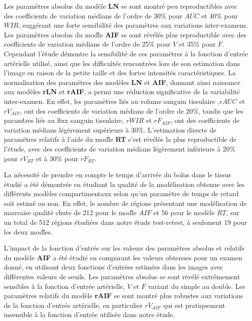 \begin{otherlanguage}{francais}
Les param\`etres absolus du mod\`ele \textbf{LN} se sont montr\'e peu reproductibles avec des coefficients de variation m\'edians de l'ordre de 30\% pour $AUC$ et 40\% pour $WIR$, sugg\'erant une forte sensibilit\'e des param\`etres aux variations inter-examens.
Les param\`etres absolus du mod\`le \textbf{AIF} se sont r\'ev\'el\'es plus reproductible avec des coefficients de variation m\'edians de l'ordre de 25\% pour $V$ et 35\% pour $F$.
Cependant l'\'etude d\'emontre la sensibilit\'e de ces param\`etres \`a la fonction d'entr\'ee art\'erielle utilis\'e, ainsi que les difficult\'es rencontr\'ees lors de son estimation dans l'image en raison de la petite taille et des fortes intensit\'es caract\'eristiques.
La normalisation des param\`etres des mod\`eles \textbf{LN} et \textbf{AIF}, donnant ainsi naissance aux mod\`eles \textbf{rLN} et \textbf{rAIF}, a permi une r\'eduction significative de la variabilit\'e inter-examen.
En effet, les param\`etres li\'es au volume sanguin tissulaire ,$rAUC$ et $rV_{AIF}$, ont des coefficients de variation m\'edians de l'ordre de 20\%, tandis que les param\`tres li\'es au flux sanguin tissulaire, $rWIR$ et $rF_{AIF}$, ont des coefficients de variation m\'edians l\'eg\`erement sup\'erieurs \`a 30\%.
L'estimation directe de param\`etres relatifs \`a l'aide du mod\`le \textbf{RT} s'est r\'ev\'el\'ee la plus reproductible de l'\'etude, avec des coefficients de variation m\'edians l\'eg\`erement inf\'erieurs \`a 20\% pour $rV_{RT}$ et \`a 30\% pour $rF_{RT}$.

La n\'ecessit\'e de prendre en compte le temps d'arriv\'ee du bolus dans le tissus \'etudi\'e a \'et\'e d\'emontr\'ee en \'etudiant la qualit\'e de la mod\'elisation obtenue avec les diff\'erents mod\`eles compartimentaux selon qu'un param\`etre de temps de retard soit estim\'e ou non. 
En effet, le nombre de r\'egions pr\'esentant une mod\'elisation de mauvaise qualit\'e chute de 212 pour le mod\`le $AIF$ et 56 pour le mod\`ele $RT$, sur un total de 512 r\'egions \'etudi\'ees dans notre \'etude test-retest, \`a seulement 19 pour les deux mod\`les.

L'impact de la fonction d'entr\'ee sur les valeurs des param\`etres absolus et relatifs du mod\`ele \textbf{AIF} a \'et\'e \'etudi\'e en comparant les valeurs obtenues pour un examen donn\'e, en utilisant deux fonctions d'entr\'ees estim\'ees dans les images avec diff\'erentes valeurs de seuils.
Les param\`etres absolus se sont r\'ev\'el\'e extr\^emement sensibles \`a la fonction d'entr\'ee art\'erielle, $V$ et $F$ variant du simple au double.
Les param\`etres relatifs du mod\`ele \textbf{rAIF} se sont montr\'e plus robustes aux variations de la fonction d'entr\'ee art\'erielle, en particulier $rV_{AIF}$ qui est pratiquement insensible \`a la fonction d'entr\`ee utilis\`ee dans notre \'etude.


\end{otherlanguage}
